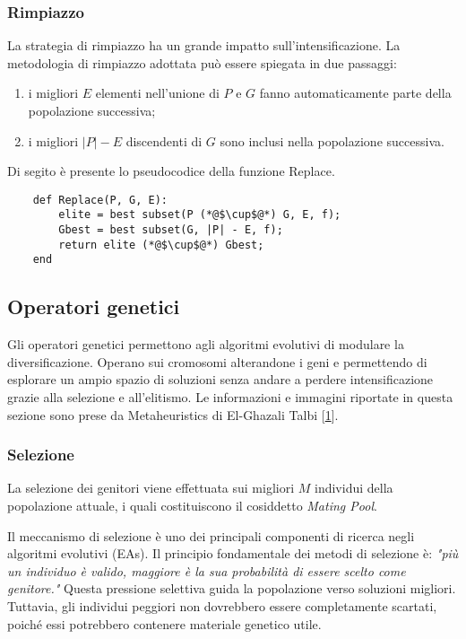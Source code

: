 \subsubsection{Rimpiazzo}
La strategia di rimpiazzo ha un grande impatto sull'intensificazione. La metodologia di rimpiazzo adottata può essere spiegata in due passaggi: 
\begin{enumerate}
    \item i migliori $E$ elementi nell'unione di $P$ e $G$ fanno automaticamente parte della popolazione successiva;
    \item i migliori $|P| - E$ discendenti di $G$ sono inclusi nella popolazione successiva.
\end{enumerate}

\noindent Di segito è presente lo pseudocodice della funzione Replace.

\begin{lstlisting}
    def Replace(P, G, E):
        elite = best subset(P (*@$\cup$@*) G, E, f);
        Gbest = best subset(G, |P| - E, f);
        return elite (*@$\cup$@*) Gbest;
    end
\end{lstlisting}

\subsection{Operatori genetici} \hypertarget{og}{}

Gli operatori genetici permettono agli algoritmi evolutivi di modulare la diversificazione. Operano sui cromosomi alterandone i geni e permettendo di esplorare un ampio spazio di soluzioni senza andare a perdere intensificazione grazie alla selezione e all'elitismo. Le informazioni e immagini riportate in questa sezione sono prese da Metaheuristics di El-Ghazali Talbi [\hyperlink{bibliografia}{1}].

\subsubsection{Selezione}

La selezione dei genitori viene effettuata sui migliori \( M \) individui della popolazione attuale, i quali costituiscono il cosiddetto \emph{Mating Pool}.

Il meccanismo di selezione è uno dei principali componenti di ricerca negli algoritmi evolutivi (EAs). Il principio fondamentale dei metodi di selezione è: \emph{"più un individuo è valido, maggiore è la sua probabilità di essere scelto come genitore."} Questa pressione selettiva guida la popolazione verso soluzioni migliori. Tuttavia, gli individui peggiori non dovrebbero essere completamente scartati, poiché essi potrebbero contenere materiale genetico utile.

